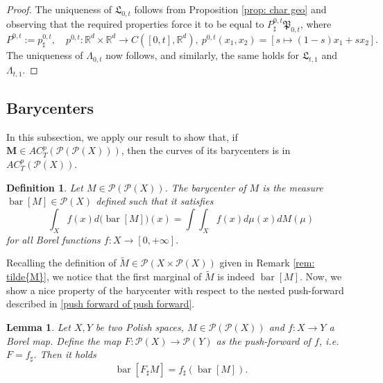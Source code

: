 \documentclass[10pt,leqno]{amsart}
\numberwithin{equation}{section}
\newtheorem{lemma}[teorema]{Lemma}
\newtheorem{df}[teorema]{Definition}
\newcommand{\R}{\mathbb{R}}
\newcommand{\PP}{\mathcal{P}}
\begin{document}
\begin{proof}
    The uniqueness of $\mathfrak{L}_{0,t}$ follows from Proposition \ref{prop: char geo} and observing that the required properties force it to be equal to $P^{0,t}_\sharp  \mathfrak{P}_{0,t}$, where 
    \[P^{0,t}:= p^{0,t}_\sharp , \quad p^{0,t}:\R^d \times \R^d \to C([0,t],\R^d), \ p^{0,t}(x_1,x_2) = [s\mapsto (1-s)x_1 + s x_2].\]
    The uniqueness of $\Lambda_{0,t}$ now follows, and similarly, the same holds for $\mathfrak{L}_{t,1}$ and $\Lambda_{t,1}$.
\end{proof}


















\subsection{Barycenters}\label{subsec: barycenters}
In this subsection, we apply our result to show that, if $\boldsymbol{M}\in AC^p_T(\PP(\PP(X)))$, then the curves of its barycenters is in $AC_T^p(\PP(X))$.
\begin{df}\label{def: barycenter}
    Let $M\in \PP(\PP(X))$. The barycenter of $M$ is the measure $\operatorname{bar}[M]\in \PP(X)$ defined such that it satisfies 
    \begin{equation}\label{mean def}
        \int_X f(x) d\big(\operatorname{bar}[M]\big)(x) = \int \int_X f(x) d\mu(x) dM(\mu) 
    \end{equation}
    for all Borel functions $f:X \to[0,+\infty]$.
\end{df}

Recalling the definition of $\widetilde{M}\in \PP(X\times \PP(X))$ given in Remark \ref{rem: tilde{M}}, we notice that the first marginal of $\widetilde{M}$ is indeed $\operatorname{bar}[M]$. Now, we show a nice property of the barycenter with respect to the nested push-forward described in \eqref{push forward of push forward}.

\begin{lemma}\label{lemma barycenters and push-forward}
    Let $X,Y$ be two Polish spaces, $M\in \PP(\PP(X))$ and $f:X\to Y$ a Borel map. Define the map $F:\PP(X) \to \PP(Y)$ as the push-forward of $f$, i.e. $F= f_\sharp $. Then it holds 
    \begin{equation}
        \operatorname{bar}[F_\sharp  M] = f_\sharp (\operatorname{bar}[M]).
    \end{equation}
\end{lemma}
\end{document}
